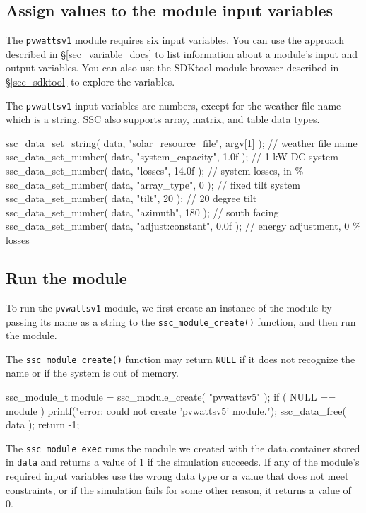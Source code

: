 \documentclass{scrartcl} %
\newcommand{\+}{\discretionary{\mbox{\scriptsize$\hookleftarrow$}}{}{}}
\begin{document}
\subsection{Assign values to the module input variables}

The \texttt{pvwattsv1} module requires six input variables. You can use the approach described in \S\ref{sec_variable_docs} to list information about a module's input and output variables. You can also use the SDKtool module browser described in \S\ref{sec_sdktool} to explore the variables.

The \texttt{pvwattsv1} input variables are numbers, except for the weather file name which is a string. SSC also supports array, matrix, and table data types.

\begin{verbatimtab}[4]
	ssc_data_set_string( data, "solar_resource_file", argv[1] ); // weather file name
	ssc_data_set_number( data, "system_capacity", 1.0f );  // 1 kW DC system
	ssc_data_set_number( data, "losses", 14.0f );      // system losses, in \%
	ssc_data_set_number( data, "array_type", 0 );      // fixed tilt system
	ssc_data_set_number( data, "tilt", 20 );           // 20 degree tilt
	ssc_data_set_number( data, "azimuth", 180 );       // south facing
	ssc_data_set_number( data, "adjust:constant", 0.0f ); // energy adjustment, 0 \% losses
\end{verbatimtab}

\subsection{Run the module}
\label{sec_run_module}

To run the \texttt{pvwattsv1} module, we first create an instance of the module by passing its name as a string to the \texttt{ssc\_module\_create()} function, and then run the module. 

The \texttt{ssc\_module\_create()} function may return \texttt{NULL} if it does not recognize the name or if the system is out of memory.

\begin{verbatimtab}[4]
	ssc_module_t module = ssc_module_create( "pvwattsv5" );
	if ( NULL == module )
	{
		printf("error: could not create 'pvwattsv5' module.\n");
		ssc_data_free( data );
		return -1;
	}
\end{verbatimtab}

The \texttt{ssc\_module\_exec} runs the module we created with the data container stored in \texttt{data} and returns a value of 1 if the simulation succeeds. If any of the module's required input variables use the wrong data type or a value that does not meet constraints, or if the simulation fails for some other reason, it returns a value of 0.
\end{document}
